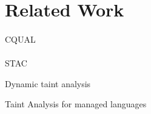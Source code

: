 \section{Related Work}

\paragraph{\cite{Shankar:2001:DFS}} CQUAL

\paragraph{\cite{Jovanovic:2006:Pixy}} STAC

Dynamic taint analysis

Taint Analysis for managed languages